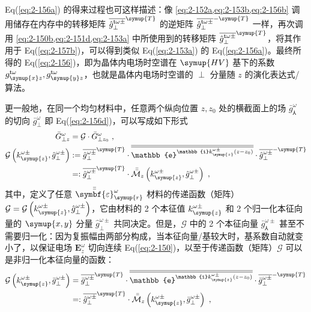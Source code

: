 Eq(\ref{eq:2-156a}) 的得来过程也可这样描述：像 \cref{eq:2-152a,eq:2-153b,eq:2-156b} 调用储存在内存中的转移矩阵 $\overline{\hat{g}^{\mathsf{t}\omega\pm}_{\perp}}^{\symup{T}}$ 的逆矩阵 $\overline{\hat{g}^{\mathsf{t}\omega\pm}_{\perp}}^{-\symup{T}}$ 一样，再次调用 \cref{eq:2-150b,eq:2-151d,eq:2-153a} 中所使用到的转移矩阵 $\overline{\hat{g}^{\mathsf{t}\omega\pm}_{\perp}}^{\symup{T}}$，将其作用于 Eq(\ref{eq:2-157b})，可以得到类似 Eq(\ref{eq:2-153a}) 的 Eq(\ref{eq:2-156a})。最终所得的 Eq(\ref{eq:2-156})，即为晶体内电场时空谱在 $\symup{HV}$ 基下的系数 $g^{\mathsf{t}\omega}_{\symup{x}z}, g^{\mathsf{t}\omega}_{\symup{y}z}$，也就是晶体内电场时空谱的 $\perp$ 分量随 $z$ 的演化表达式/算法。

更一般地，在同一个均匀材料中，任意两个纵向位置 $z, z_0$ 处的横截面上的场 $\bar{g}^{\omega}_{\Yup}$ 的切向 $\bar{g}^{\omega}_{\perp}$ 即 Eq(\ref{eq:2-156d})，可以写成如下形式
\begin{subequations} \label{eq:2-158}
	\abovedisplayskip=10pt
	\belowdisplayskip=10pt
	\begin{align}
		\bar{G}^{\omega}_{\perp z} &= \mathcal{G} \cdot \bar{G}^{\omega}_{\perp z_0} \label{eq:2-158a}~,\\ \mathcal{G} \left( k^{\omega\pm}_{\symup{z}}, \hat{g}^{\omega\pm}_{\perp} \right) &:= \overline{\hat{g}^{\omega\pm}_{\perp}}^{\symup{T}} \cdot \overline{\overline{\mathbb{e}^{ \mathbb{i} k^{\omega\pm}_{\symup{z}} \left( z - z_0 \right)}}} \cdot \overline{\hat{g}^{\omega\pm}_{\perp}}^{-\symup{T}} \label{eq:2-158b}\\ &=: \overline{\hat{g}^{\omega\pm}_{\perp}}^{\symup{T}} \cdot \bar{\bar{\mathcal{M}}}_z \left( k^{\omega\pm}_{\symup{z}}, \hat{g}^{\omega\pm}_{\perp} \right) \label{eq:2-158c}~,
	\end{align}
\end{subequations}
其中，定义了任意 $\bar{\bar{\symbf{\varepsilon}}}_{\symup{r}}^{\omega}$ 材料的传递函数（矩阵）$\mathcal{G} = \mathcal{G} \left( k^{\omega\pm}_{\symup{z}}, \hat{g}^{\omega\pm}_{\perp} \right)$，它由材料的 2 个本征值 $k^{\omega\pm}_{\symup{z}}$ 和 2 个归一化本征向量的 $\symup{x,y}$ 分量 $\hat{g}^{\omega\pm}_{\perp}$ 共同决定。但是，$\mathcal{G}$ 中的 2 个本征向量 $\bar{g}^{\omega\pm}_{\Yup}$ 甚至不需要归一化：因为复振幅由两部分构成，当本征向量/基较大时，基系数自动就变小了，以保证电场 $\symbf E^{\omega}_z$ 切向连续 Eq(\ref{eq:2-150})，以至于传递函数（矩阵）$\mathcal{G}$ 可以是非归一化本征向量的函数：
\begin{subequations} \label{eq:2-159}
	\abovedisplayskip=10pt
	\belowdisplayskip=10pt
	\begin{align}
		\mathcal{G} \left( k^{\omega\pm}_{\symup{z}}, \bar{g}^{\omega\pm}_{\perp} \right) &= 	\overline{\bar{g}^{\omega\pm}_{\perp}}^{\symup{T}} \cdot \overline{\overline{\mathbb{e}^{ \mathbb{i} k^{\omega\pm}_{\symup{z}} \left( z - z_0 \right)}}} \cdot \overline{\bar{g}^{\omega\pm}_{\perp}}^{-\symup{T}} \label{eq:2-159a}\\ &=: \overline{\hat{g}^{\omega\pm}_{\perp}}^{\symup{T}} \cdot \bar{\bar{\mathcal{M}}}_z \left( k^{\omega\pm}_{\symup{z}}, \bar{g}^{\omega\pm}_{\perp} \right) \label{eq:2-159b}~,
	\end{align}
\end{subequations}
